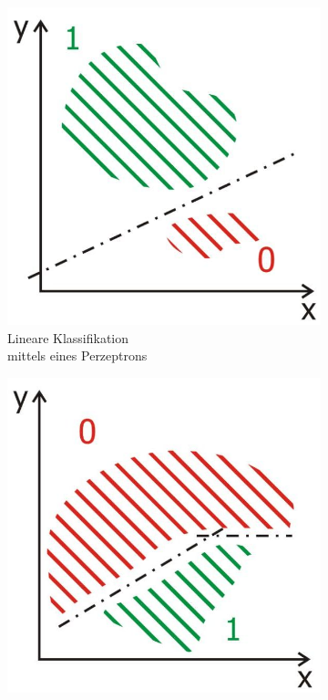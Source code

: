 \begin{figure}[H]
	\captionsetup[subfigure]{position=b}
	\centering
	\begin{subfigure}[b]{0.3\textwidth}
		\centering
		\includegraphics[width=\textwidth]{kapitel3/images/linear_classification.jpg}
		\caption{Lineare \hspace{-0.16cm} Klassifikation \\ mittels eines Perzeptrons}
		\label{linear-classification}
	\end{subfigure}
	\hspace{1em}
	\begin{subfigure}[b]{0.3\textwidth}
		\centering
		\includegraphics[width=\textwidth]{kapitel3/images/non_linear_classification.jpg}

\end{subfigure}
\end{figure}
